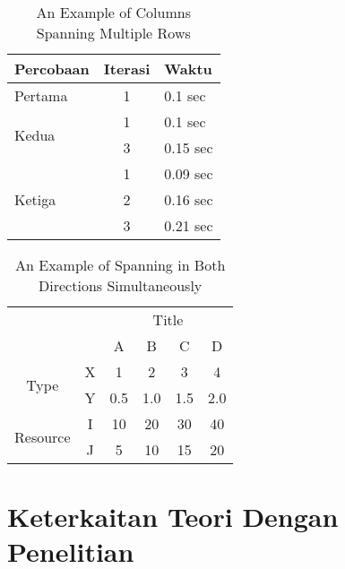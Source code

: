 \begin{table}
	\centering
	\caption{An Example of Columns Spanning Multiple Rows}
	\label{column.spanning}
	\begin{tabular}{|l|c|l|}
		\hline
		Percobaan & Iterasi & Waktu \\
		\hline
		Pertama & 1 & 0.1 sec \\ \hline
		\multirow{2}{*}{Kedua} & 1 & 0.1 sec \\
		& 3 & 0.15 sec \\
		\hline
		\multirow{3}{*}{Ketiga} & 1 & 0.09 sec \\
		& 2 & 0.16 sec \\
		& 3 & 0.21 sec \\
		\hline
	\end{tabular}
\end{table}

\begin{table}
	\centering
	\caption{An Example of Spanning in Both Directions Simultaneously}
	\label{mix.spanning}
	\begin{tabular}{cc|c|c|c|c|}
		\cline{3-6}
		& & \multicolumn{4}{|c|}{Title} \\ \cline{3-6}
		& & A & B & C & D \\ \hline
		\multicolumn{1}{|c|}{\multirow{2}{*}{Type}} &
		\multicolumn{1}{|c|}{X} & 1 & 2 & 3 & 4\\ \cline{2-6}
		\multicolumn{1}{|c|}{}                        &
		\multicolumn{1}{|c|}{Y} & 0.5 & 1.0 & 1.5 & 2.0\\ \cline{1-6}
		\multicolumn{1}{|c|}{\multirow{2}{*}{Resource}} &
		\multicolumn{1}{|c|}{I} & 10 & 20 & 30 & 40\\ \cline{2-6}
		\multicolumn{1}{|c|}{}                        &
		\multicolumn{1}{|c|}{J} & 5 & 10 & 15 & 20\\ \cline{1-6}
	\end{tabular}
\end{table}


\section{Keterkaitan Teori Dengan Penelitian}
\label{sec:keterkaitan}

